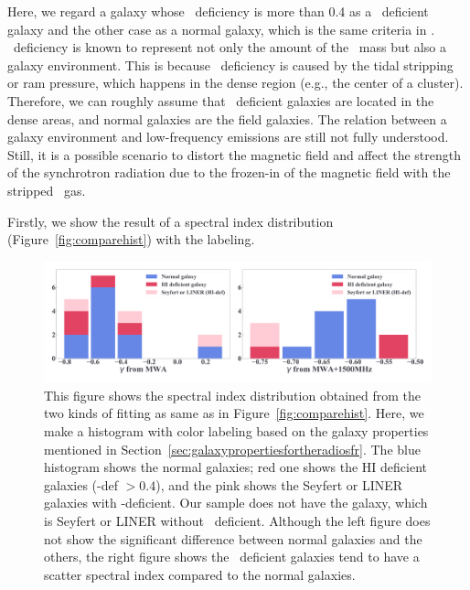 Here, we regard a galaxy whose \nh~deficiency is more than 0.4 as a \nh~deficient galaxy and the other case as a normal galaxy, which is the same criteria in \citet{Ciesla2016}.
\nh~deficiency is known to represent not only the amount of the \nh~mass but also a galaxy environment.
This is because \nh~deficiency is caused by the tidal stripping or ram pressure, which happens in the dense region (e.g., the center of a cluster).
Therefore, we can roughly assume that \nh~deficient galaxies are located in the dense areas, and normal galaxies are the field galaxies.
The relation between a galaxy environment and low-frequency emissions are still not fully understood.
Still, it is a possible scenario to distort the magnetic field and affect the strength of the synchrotron radiation due to the frozen-in of the magnetic field with the stripped \nh~gas.

Firstly, we show the result of a spectral index distribution (Figure~\ref{fig:comparehist}) with the labeling.

\begin{figure}[htbp]
	\centering
	\includegraphics[width=\linewidth]{Chapter_6/Figures/Discuss_comparehist.pdf}
    \caption[Histograms of $\gamma$ from the fitting (labeled)]{\label{fig:comparehist_h1def}
        This figure shows the spectral index distribution obtained from the two kinds of fitting as same as in Figure~\ref{fig:comparehist}.
        Here, we make a histogram with color labeling based on the galaxy properties mentioned in Section~\ref{sec:galaxypropertiesfortheradiosfr}.
        The blue histogram shows the normal galaxies; red one shows the HI deficient galaxies (\nh-def $> 0.4$), and the pink shows the Seyfert or LINER galaxies with \nh-deficient.
        Our sample does not have the galaxy, which is Seyfert or LINER without \nh~deficient.
        Although the left figure does not show the significant difference between normal galaxies and the others, the right figure shows the \nh~deficient galaxies tend to have a scatter spectral index compared to the normal galaxies.
    }
\end{figure}

